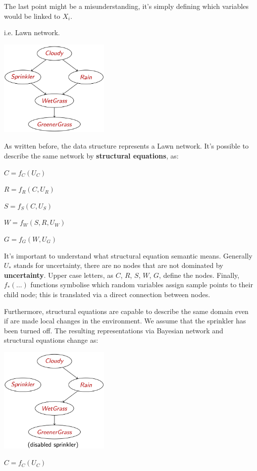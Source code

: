 The last point might be a misunderstanding, it's simply defining which variables would be linked to $X_i$.
\begin{example}
    i.e. Lawn network. \vspace{3.5pt}
    \begin{center}
        \includegraphics[width=0.4\textwidth]{img/img8.png}
    \end{center} \vspace{3.5pt}
    As written before, the data structure represents a Lawn network. It's possible to describe the same network by \textbf{structural equations}, as: \vspace{3.5pt}

    $C = f_C(U_C)$

    $R = f_R(C, U_R)$

    $S = f_S(C, U_S)$

    $W = f_W(S, R, U_W)$

    $G = f_G(W, U_G)$ \vspace{3.5pt}

    It's important to understand what structural equation semantic means. Generally $U_*$ stands for uncertainty, there are no nodes that are not dominated by \textbf{uncertainty}.
    Upper case letters, as $C$, $R$, $S$, $W$, $G$, define the nodes. Finally, $f_*(\dots)$ functions symbolise which random variables assign sample points to their child node; this is translated via a direct connection between nodes. \vspace{3.5pt}

    Furthermore, structural equations are capable to describe the same domain even if are made local changes in the environment. We assume that the sprinkler has been turned off. 
    The resulting representations via Bayesian network and structural equations change as: \vspace{3.5pt}
    \begin{center}
        \includegraphics[width=0.4\textwidth]{img/img9.png}
    \end{center} \vspace{3.5pt}
    $C = f_C(U_C)$


\end{example}
